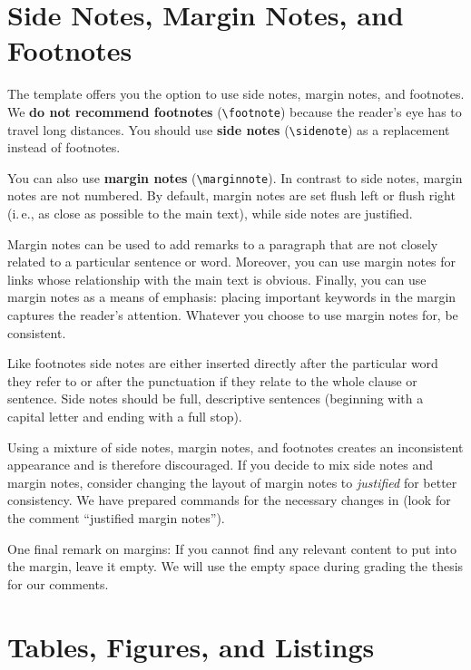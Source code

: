 \section{Side Notes, Margin Notes, and Footnotes}

The template offers you the option to use side notes, margin notes, and footnotes. We \textbf{do not recommend footnotes} (\verb|\footnote|) because the reader's eye has to travel long distances. You should use \textbf{side notes} (\verb|\sidenote|) as a replacement instead of footnotes.

You can also use \textbf{margin notes} (\verb|\marginnote|). In contrast to side notes, margin notes are not numbered. By default, margin notes are set flush left or flush right (i.\,e., as close as possible to the main text), while side notes are justified.

Margin notes can be used to add remarks to a paragraph that are not closely related to a particular sentence or word. Moreover, you can use margin notes for links whose relationship with the main text is obvious. Finally, you can use margin notes as a means of emphasis: placing important keywords in the margin captures the reader's attention. Whatever you choose to use margin notes for, be consistent.

Like footnotes side notes are either inserted directly after the particular word they refer to or after the punctuation if they relate to the whole clause or sentence. Side notes should be full, descriptive sentences (beginning with a capital letter and ending with a full stop).

Using a mixture of side notes, margin notes, and footnotes creates an inconsistent appearance and is therefore discouraged. If you decide to mix side notes and margin notes, consider changing the layout of margin notes to \emph{justified} for better consistency. We have prepared commands for the necessary changes in  (look for the comment ``justified margin notes'').

One final remark on margins: If you cannot find any relevant content to put into the margin, leave it empty. We will use the empty space during grading the thesis for our comments.

\section{Tables, Figures, and Listings}
\label{sec:tablesfigureslistings}

